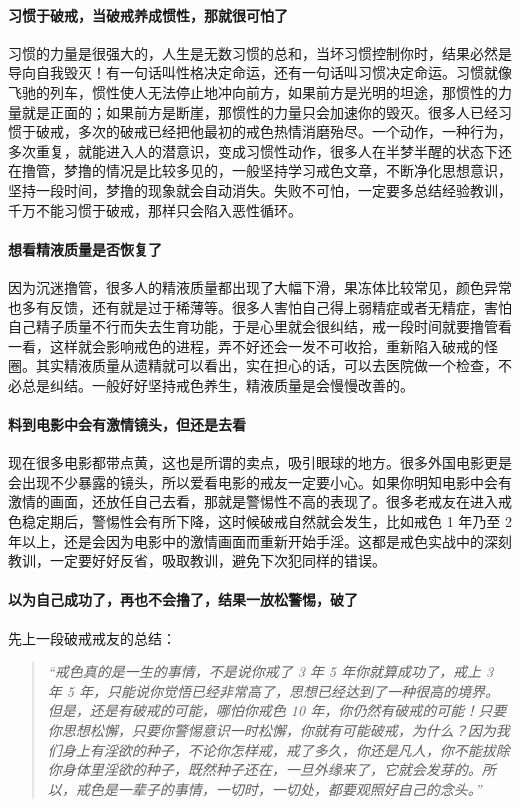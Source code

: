 \paragraph{习惯于破戒，当破戒养成惯性，那就很可怕了} 习惯的力量是很强大的，人生是无数习惯的总和，当坏习惯控制你时，结果必然是导向自我毁灭！有一句话叫性格决定命运，还有一句话叫习惯决定命运。习惯就像飞驰的列车，惯性使人无法停止地冲向前方，如果前方是光明的坦途，那惯性的力量就是正面的；如果前方是断崖，那惯性的力量只会加速你的毁灭。很多人已经习惯于破戒，多次的破戒已经把他最初的戒色热情消磨殆尽。一个动作，一种行为，多次重复，就能进入人的潜意识，变成习惯性动作，很多人在半梦半醒的状态下还在撸管，梦撸的情况是比较多见的，一般坚持学习戒色文章，不断净化思想意识，坚持一段时间，梦撸的现象就会自动消失。失败不可怕，一定要多总结经验教训，千万不能习惯于破戒，那样只会陷入恶性循环。

\paragraph{想看精液质量是否恢复了} 因为沉迷撸管，很多人的精液质量都出现了大幅下滑，果冻体比较常见，颜色异常也多有反馈，还有就是过于稀薄等。很多人害怕自己得上弱精症或者无精症，害怕自己精子质量不行而失去生育功能，于是心里就会很纠结，戒一段时间就要撸管看一看，这样就会影响戒色的进程，弄不好还会一发不可收拾，重新陷入破戒的怪圈。其实精液质量从遗精就可以看出，实在担心的话，可以去医院做一个检查，不必总是纠结。一般好好坚持戒色养生，精液质量是会慢慢改善的。

\paragraph{料到电影中会有激情镜头，但还是去看} 现在很多电影都带点黄，这也是所谓的卖点，吸引眼球的地方。很多外国电影更是会出现不少暴露的镜头，所以爱看电影的戒友一定要小心。如果你明知电影中会有激情的画面，还放任自己去看，那就是警惕性不高的表现了。很多老戒友在进入戒色稳定期后，警惕性会有所下降，这时候破戒自然就会发生，比如戒色 1 年乃至 2 年以上，还是会因为电影中的激情画面而重新开始手淫。这都是戒色实战中的深刻教训，一定要好好反省，吸取教训，避免下次犯同样的错误。

\paragraph{以为自己成功了，再也不会撸了，结果一放松警惕，破了} 先上一段破戒戒友的总结：

\begin{quote}\it
    “戒色真的是一生的事情，不是说你戒了 3 年 5 年你就算成功了，戒上 3 年 5 年，只能说你觉悟已经非常高了，思想已经达到了一种很高的境界。但是，还是有破戒的可能，哪怕你戒色 10 年，你仍然有破戒的可能！只要你思想松懈，只要你警惕意识一时松懈，你就有可能破戒，为什么？因为我们身上有淫欲的种子，不论你怎样戒，戒了多久，你还是凡人，你不能拔除你身体里淫欲的种子，既然种子还在，一旦外缘来了，它就会发芽的。所以，戒色是一辈子的事情，一切时，一切处，都要观照好自己的念头。”
\end{quote}

